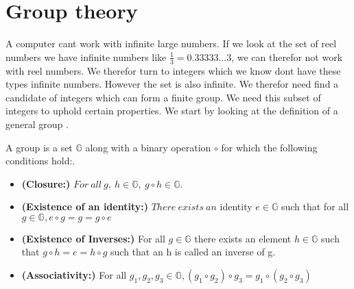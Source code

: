 
\section{Group theory}
A computer cant work with infinite large numbers. If we look at the set of reel numbers we have infinite numbers like $\frac{1}{3} = 0.33333...3$, we can therefor not work with reel numbers. We therefor turn to integers which we know dont have these types infinite numbers. However the set is also infinite. We therefor need find a candidate of integers which can form a finite group. We need this subset of integers to uphold certain properties. We start by looking at the definition of a general group \cite{Paar}.  

\begin{defi}
A \textnormal{group} is a set \begin{math}\mathbb{G}\end{math} along with a binary operation \begin{math}\circ \end{math} for which the following conditions hold:.
\begin{itemize}
\item \textnormal{\textbf{(Closure:)}}  \begin{math} For \ all \ g, \ h \in \mathbb{G},\ g \circ h \in \mathbb{G} \end{math}.
\item \textnormal{\textbf{(Existence of an identity:)}} \begin{math} There \ exists \ an \end{math} \textnormal{identity} \begin{math} e \in \mathbb{G} \end{math} such that for  all \begin{math} g \in \mathbb{G}, e \circ g = g =g \circ e \end{math}
\item \textnormal{\textbf{(Existence of Inverses:)}} For all \begin{math}g \in \mathbb{G}\end{math} there exists an element \begin{math}h \in \mathbb{G}\end{math} such that \begin{math}g \circ h = e =h \circ g \end{math} such that an h is called an \textnormal{inverse} of g.
\item \textnormal{\textbf{(Associativity:)}} For all \begin{math}g_1, g_2, g_3 \in \mathbb{G}, (g_1 \circ g_2) \circ g_3 = g_1 \circ( g_2 \circ g_3) \end{math}

\end{itemize}
\end{defi}
